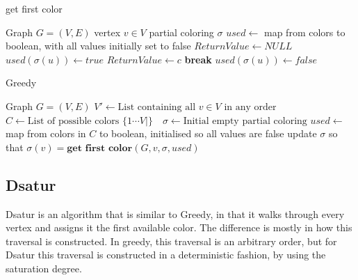 \documentclass[a4paper]{article}
\newcommand{\algorithmicbreak}{\textbf{break}}
\newcommand{\BREAK}{\STATE \algorithmicbreak}
\begin{document}
\begin{algorithm}[H]
  \caption{get first color}
  \label{alg:greedy}
  \begin{algorithmic}[1]
      \REQUIRE Graph $G = (V,E)$
      \REQUIRE vertex $v \in V$
      \REQUIRE partial coloring $\sigma$
      \REQUIRE $used \leftarrow $ map from colors to boolean, with all values
      initially set to false
        \STATE $ReturnValue \leftarrow NULL$
                \STATE $used(\sigma(u)) \leftarrow true$
            \ENDIF
        \ENDFOR
                \STATE $ReturnValue \leftarrow c$
                \BREAK
            \ENDIF
        \ENDFOR
                \STATE $used(\sigma(u)) \leftarrow false$
            \ENDIF
        \ENDFOR
  \end{algorithmic}
\end{algorithm}


\begin{algorithm}[H]
  \caption{Greedy}
  \label{alg:greedy}
  \begin{algorithmic}[1]
      \REQUIRE Graph $G = (V,E)$
      \STATE $V' \leftarrow \text{List containing all $v \in V$ in any order}$
      \STATE $C \leftarrow \text{List of possible colors $\{1 \cdots V| \}$ }$
      \STATE $\sigma \leftarrow \text{Initial empty partial coloring}$
      \STATE $used \leftarrow $ map from colors in $C$ to boolean, initialised
      so all values are false
        \STATE update $\sigma$ so that  $\sigma(v) = \textbf{get first color}(G,v,\sigma,used)$
    \ENDFOR
  \end{algorithmic}
\end{algorithm}

\subsection{Dsatur}

Dsatur is an algorithm that is similar to Greedy, in that it walks through every
vertex and assigns it the first available color. The difference is mostly in
how this traversal is constructed. In greedy, this traversal is an arbitrary
order, but for Dsatur this traversal is constructed in a deterministic fashion,
by using the saturation degree.
\end{document}
